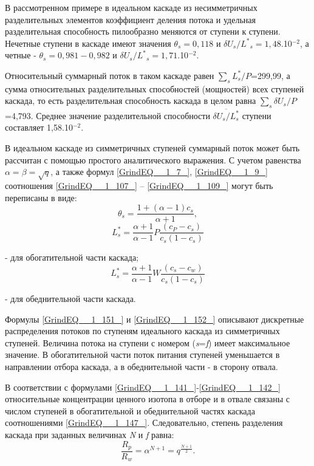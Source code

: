 В рассмотренном примере в идеальном каскаде из несимметричных разделительных элементов коэффициент деления потока и удельная разделительная способность пилообразно меняются от ступени к ступени. Нечетные ступени в каскаде имеют значения $\theta _{s} =0,118$ и $\delta U_{s} /L^{*} {}_{s} =1,48$$.$10${}^{-2}$, а четные - $\theta _{s} =0,981-0,982$ и $\delta U_{s} /L^{*} {}_{s} =1,71$$.$10${}^{-2}$. 

 Относительный суммарный поток в таком каскаде равен $\sum _{s}L_{s}^{*} /P $=299,99, а сумма относительных разделительных способностей (мощностей) всех ступеней каскада, то есть разделительная способность каскада в целом равна $\sum _{s}\delta U_{s} /P $=4,793. Среднее значение разделительной способности $\overline{\delta U_{s} /L_{s}^{*} }$ ступени составляет 1,58$.$10${}^{-2}$.


В идеальном каскаде из симметричных ступеней суммарный поток может быть рассчитан с помощью простого аналитического выражения. С учетом равенства $\alpha =\beta =\sqrt{q} $, а также формул \ref{GrindEQ__1_7_}, \ref{GrindEQ__1_9_} соотношения \ref{GrindEQ__1_107_} -- \ref{GrindEQ__1_109_} могут быть переписаны в виде:
\begin{equation} \label{GrindEQ__1_150_} 
\theta _{s} =\frac{1+(\alpha -1)c_{s} }{\alpha +1} ,                            
\end{equation} 
\begin{equation} \label{GrindEQ__1_151_} 
L_{s}^{*} =\frac{\alpha +1}{\alpha -1} P\frac{(c_{P} -c_{s} )}{c_{s} (1-c_{s} )}  
\end{equation} 

- для обогатительной части каскада; 
\begin{equation} \label{GrindEQ__1_152_} 
L_{s}^{*} =\frac{\alpha +1}{\alpha -1} W\frac{(c_{s} -c_{w} )}{c_{s} (1-c_{s} )}  
\end{equation} 

- для обеднительной части каскада.

Формулы \ref{GrindEQ__1_151_} и \ref{GrindEQ__1_152_} описывают дискретные распределения потоков по ступеням идеального каскада из симметричных ступеней. Величина потока на ступени с номером (\textit{s}=\textit{f}) имеет максимальное значение. В обогатительной части поток питания ступеней уменьшается в направлении отбора каскада, а в обеднительной части - в сторону отвала.

 В соответствии с формулами \ref{GrindEQ__1_141_}-\ref{GrindEQ__1_142_} относительные концентрации ценного изотопа в отборе и в отвале связаны с числом ступеней в обогатительной и обеднительной частях каскада соотношениями \ref{GrindEQ__1_147_}. Следовательно, степень разделения каскада при заданных величинах \textit{N} и \textit{f} равна:
\begin{equation} \label{GrindEQ__1_153_} 
\frac{R_{p} }{R_{w} } =\alpha ^{N+1} =q^{\frac{N+1}{2} } .                         
\end{equation} 

